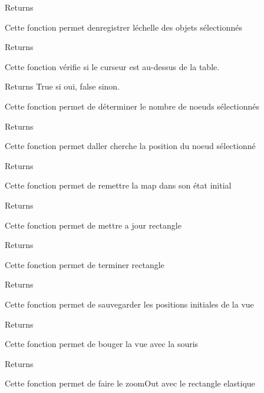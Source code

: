 \begin{DoxyReturn}{Returns}

\end{DoxyReturn}
Cette fonction permet d\textquotesingle{}enregistrer l\textquotesingle{}échelle des objets sélectionnés

\begin{DoxyReturn}{Returns}

\end{DoxyReturn}
Cette fonction vérifie si le curseur est au-\/dessus de la table.

\begin{DoxyReturn}{Returns}
True si oui, false sinon.
\end{DoxyReturn}
Cette fonction permet de déterminer le nombre de noeuds sélectionnés

\begin{DoxyReturn}{Returns}

\end{DoxyReturn}
Cette fonction permet d\textquotesingle{}aller cherche la position du noeud sélectionné

\begin{DoxyReturn}{Returns}

\end{DoxyReturn}
Cette fonction permet de remettre la map dans son état initial

\begin{DoxyReturn}{Returns}

\end{DoxyReturn}
Cette fonction permet de mettre a jour rectangle

\begin{DoxyReturn}{Returns}

\end{DoxyReturn}
Cette fonction permet de terminer rectangle

\begin{DoxyReturn}{Returns}

\end{DoxyReturn}
Cette fonction permet de sauvegarder les positions initiales de la vue

\begin{DoxyReturn}{Returns}

\end{DoxyReturn}
Cette fonction permet de bouger la vue avec la souris

\begin{DoxyReturn}{Returns}

\end{DoxyReturn}
Cette fonction permet de faire le zoom\+Out avec le rectangle elastique

